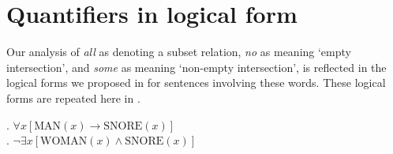 \section{Quantifiers in logical form}\label{sec:14.3}

Our analysis of \textit{all} as denoting a subset relation, \textit{no} as meaning ‘empty intersection’, and \textit{some} as meaning ‘non-empty intersection’, is reflected in the logical forms we proposed in  for sentences involving these words. These logical forms are repeated here in .


\ea \label{ex:14.10}
.  $\forall x [\text{MAN}(x) \rightarrow \text{SNORE}(x)]$\\
.  $\neg\exists x[\text{WOMAN}(x) \wedge \text{SNORE}(x)]$\\
